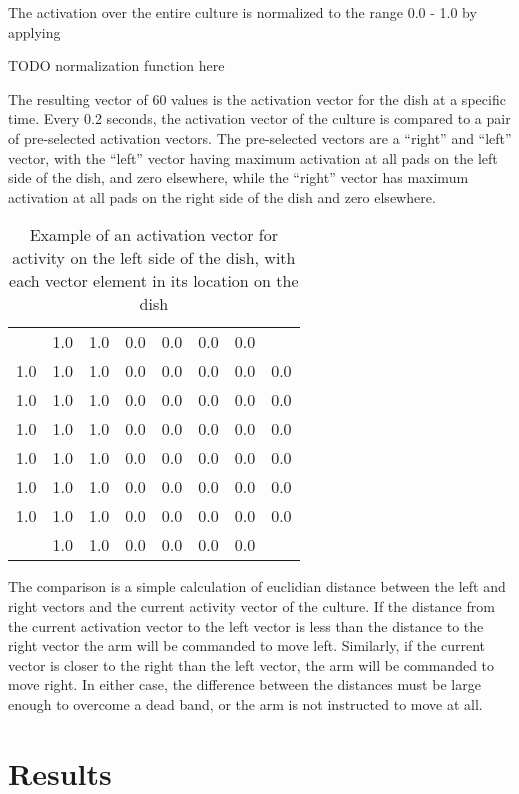 \documentclass[letterpaper]{article}
\begin{document}
The activation over the entire culture is normalized to the range 0.0 - 1.0 by applying

TODO normalization function here

The resulting vector of 60 values is the activation vector for the dish at a specific time.
Every 0.2 seconds, the activation vector of the culture is compared to a pair of pre-selected activation vectors. 
The pre-selected vectors are a ``right'' and ``left'' vector, with the ``left'' vector having maximum activation at all pads on the left side of the dish, and zero elsewhere, while the ``right'' vector has maximum activation at all pads on the right side of the dish and zero elsewhere. 

\begin{table}
\begin{tabular}{cccccccc}
 & 1.0 & 1.0 & 0.0 & 0.0 & 0.0 & 0.0 &  \\ 
1.0 & 1.0 & 1.0 & 0.0 & 0.0 & 0.0 & 0.0 & 0.0 \\ 
1.0 & 1.0 & 1.0 & 0.0 & 0.0 & 0.0 & 0.0 & 0.0 \\ 
1.0 & 1.0 & 1.0 & 0.0 & 0.0 & 0.0 & 0.0 & 0.0 \\ 
1.0 & 1.0 & 1.0 & 0.0 & 0.0 & 0.0 & 0.0 & 0.0 \\ 
1.0 & 1.0 & 1.0 & 0.0 & 0.0 & 0.0 & 0.0 & 0.0 \\ 
1.0 & 1.0 & 1.0 & 0.0 & 0.0 & 0.0 & 0.0 & 0.0 \\ 
 & 1.0 & 1.0 & 0.0 & 0.0 & 0.0 & 0.0 &  \\ 
\end{tabular}
\caption{Example of an activation vector for activity on the left side of the dish, with each vector element in its location on the dish} 
\end{table}

The comparison is a simple calculation of euclidian distance between the left and right vectors and the current activity vector of the culture. 
If the distance from the current activation vector to the left vector is less than the distance to the right vector the arm will be commanded to move left. 
Similarly, if the current vector is closer to the right than the left vector, the arm will be commanded to move right. 
In either case, the difference between the distances must be large enough to overcome a dead band, or the arm is not instructed to move at all. 



\section{Results}
\end{document}
